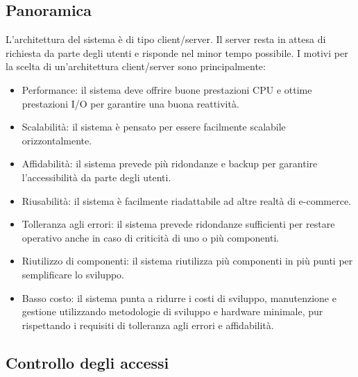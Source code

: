 \documentclass[12pt,a4paper]{article}
\begin{document}
\subsection{Panoramica}
L'architettura del sistema è di tipo client/server. Il server resta in attesa di richiesta da parte degli utenti e risponde nel minor tempo possibile.
I motivi per la scelta di un'architettura client/server sono principalmente:
\begin{itemize}
\item Performance: il sistema deve offrire buone prestazioni CPU e ottime prestazioni I/O per garantire una buona reattività.
\item Scalabilità: il sistema è pensato per essere facilmente scalabile orizzontalmente.
\item Affidabilità: il sistema prevede più ridondanze e backup per garantire l'accessibilità da parte degli utenti.
\item Riusabilità: il sistema è facilmente riadattabile ad altre realtà di e-commerce.
\item Tolleranza agli errori: il sistema prevede ridondanze sufficienti per restare operativo anche in caso di criticità di uno o più componenti.
\item Riutilizzo di componenti: il sistema riutilizza più componenti in più punti per semplificare lo sviluppo.
\item Basso costo: il sistema punta a ridurre i costi di sviluppo, manutenzione e gestione utilizzando metodologie di sviluppo e hardware minimale, pur rispettando i requisiti di tolleranza agli errori e affidabilità. 
\end{itemize}

\newpage

\subsection{Controllo degli accessi}
\end{document}

